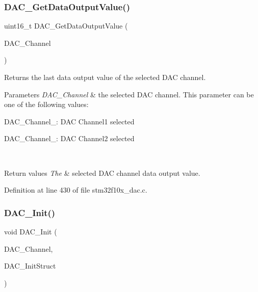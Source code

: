 \subsubsection{\texorpdfstring{D\+A\+C\+\_\+\+Get\+Data\+Output\+Value()}{DAC\_GetDataOutputValue()}}
{\footnotesize\ttfamily uint16\+\_\+t D\+A\+C\+\_\+\+Get\+Data\+Output\+Value (\begin{DoxyParamCaption}\item[{uint32\+\_\+t}]{D\+A\+C\+\_\+\+Channel }\end{DoxyParamCaption})}



Returns the last data output value of the selected D\+AC channel. 


\begin{DoxyParams}{Parameters}
{\em D\+A\+C\+\_\+\+Channel} & the selected D\+AC channel. This parameter can be one of the following values\+: \begin{DoxyItemize}
\item D\+A\+C\+\_\+\+Channel\+\_\+: D\+AC Channel1 selected \item D\+A\+C\+\_\+\+Channel\+\_\+: D\+AC Channel2 selected \end{DoxyItemize}
\\
\hline
\end{DoxyParams}

\begin{DoxyRetVals}{Return values}
{\em The} & selected D\+AC channel data output value. \\
\hline
\end{DoxyRetVals}


Definition at line 430 of file stm32f10x\+\_\+dac.\+c.

\mbox{\label{group___d_a_c___exported___functions_ga7c59850468ed4bf0659663fe495441da}} 
\subsubsection{\texorpdfstring{D\+A\+C\+\_\+\+Init()}{DAC\_Init()}}
{\footnotesize\ttfamily void D\+A\+C\+\_\+\+Init (\begin{DoxyParamCaption}\item[{uint32\+\_\+t}]{D\+A\+C\+\_\+\+Channel,  }\item[{\hyperlink{struct_d_a_c___init_type_def}{D\+A\+C\+\_\+\+Init\+Type\+Def} $\ast$}]{D\+A\+C\+\_\+\+Init\+Struct }\end{DoxyParamCaption})}



